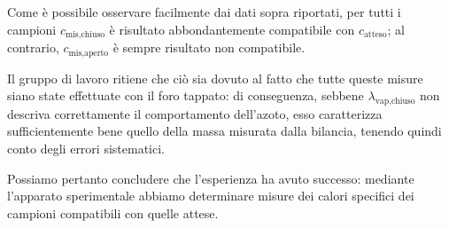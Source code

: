 \documentclass{article}
\begin{document}
Come è possibile osservare facilmente dai dati sopra
riportati, per tutti i campioni $c_\text{mis,chiuso}$ è risultato
abbondantemente compatibile con $c_\text{atteso}$; al contrario,
$c_\text{mis,aperto}$ è sempre risultato non compatibile.

Il gruppo di lavoro ritiene che ciò sia dovuto al fatto che tutte
queste misure siano state effettuate con il foro tappato:
di conseguenza, sebbene $\lambda_\text{vap,chiuso}$ non descriva
correttamente il comportamento dell'azoto, esso caratterizza
sufficientemente bene quello della massa misurata
dalla bilancia, tenendo quindi conto degli errori sistematici.

Possiamo pertanto concludere che l'esperienza ha avuto successo:
mediante l'apparato sperimentale abbiamo determinare misure dei calori
specifici dei campioni compatibili con quelle attese.
\end{document}
